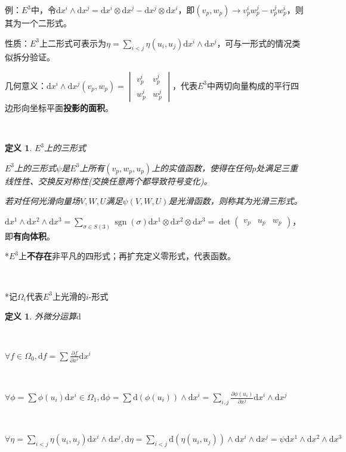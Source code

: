 \documentclass[a4paper,UTF8,fontset=windows]{ctexart}
\DeclareMathOperator{\sgn}{sgn}
\newtheorem{dfn}[thm]{定义}
\begin{document}
例：$E^3$中，令$\mathrm{d}x^i\wedge\mathrm{d}x^j=\mathrm{d}x^i\otimes\mathrm{d}x^j-\mathrm{d}x^j\otimes\mathrm{d}x^i$，即$(v_p,w_p)\to v_p^iw_p^j-v_p^jw_p^i$，则其为一个二形式。

性质：$E^3$上二形式可表示为$\eta=\sum_{i<j}\eta(u_i,u_j)\mathrm{d}x^i\wedge\mathrm{d}x^j$，可与一形式的情况类似拆分验证。

几何意义：$\mathrm{d}x^i\wedge\mathrm{d}x^j(v_p,w_p)=\begin{vmatrix}v_p^i&v_p^j\\w_p^i&w_p^j\end{vmatrix}$，代表$E^3$中两切向量构成的平行四边形向坐标平面\textbf{投影的面积}。

\

\begin{dfn} $E^3$上的三形式

$E^3$上的三形式$\psi$是$E^3$上所有$(v_p,w_p,u_p)$上的实值函数，使得在任何$p$处满足三重线性性、交换反对称性(交换任意两个都导致符号变化)。

若对任何光滑向量场$V,W,U$满足$\psi(V,W,U)$是光滑函数，则称其为光滑三形式。
\end{dfn}

$\mathrm{d}x^1\wedge\mathrm{d}x^2\wedge\mathrm{d}x^3=\sum_{\sigma\in S(3)}\sgn(\sigma)\mathrm{d}x^1\otimes\mathrm{d}x^2\otimes\mathrm{d}x^3=\det\begin{pmatrix}v_p&u_p&w_p\end{pmatrix}$，即\textbf{有向体积}。

*$E^3$上\textbf{不存在}非平凡的四形式；再扩充定义零形式，代表函数。

\

*记$\Omega_i$代表$E^3$上光滑的$i$-形式

\begin{dfn} 外微分运算$\mathrm{d}$

\

$\displaystyle\forall f\in\Omega_0,\mathrm{d}f=\sum\frac{\partial f}{\partial x^i}\mathrm{d}x^i$

\

$\displaystyle\forall\phi=\sum\phi(u_i)\mathrm{d}x^i\in\Omega_1,\mathrm{d}\phi=\sum\mathrm{d}(\phi(u_i))\wedge\mathrm{d}x^i=\sum_{i,j}\frac{\partial \phi(u_i)}{\partial x^j}\mathrm{d}x^i\wedge\mathrm{d}x^j$

\

$\displaystyle\forall\eta=\sum_{i<j}\eta(u_i,u_j)\mathrm{d}x^i\wedge\mathrm{d}x^j,\mathrm{d}\eta=\sum_{i<j}\mathrm{d}(\eta(u_i,u_j))\wedge\mathrm{d}x^i\wedge\mathrm{d}x^j=\psi\mathrm{d}x^1\wedge\mathrm{d}x^2\wedge\mathrm{d}x^3$
\end{dfn}
\end{document}
